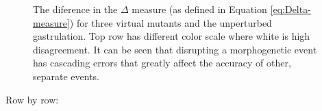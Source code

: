 \begin{figure}[H]
    \centering
    \caption{The diference in the $\Delta$ measure (as defined in Equation \ref{eq:Delta-measure}) for three virtual mutants and the unperturbed gastrulation. Top row has different color scale where white is high disagreement. 
    It can be seen that disrupting a morphogenetic event has cascading errors that greatly affect the accuracy of other, separate events.}
    \label{fig:compare-motionAgreement-space}
\end{figure}
\newpage


Row by row:

